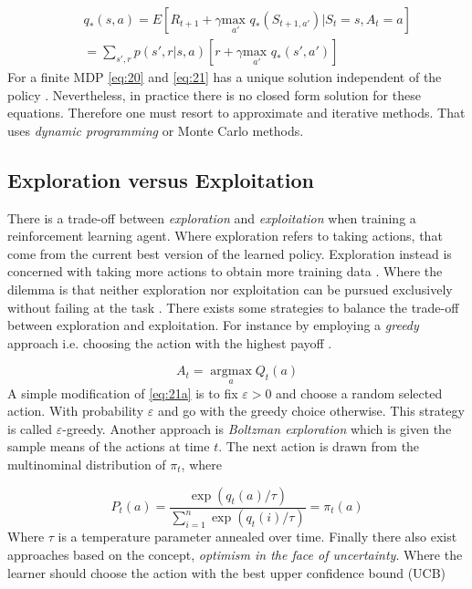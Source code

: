 \documentclass{kththesis}
\theoremstyle{definition}
\begin{document}
\begin{equation}
\label{eq:21}
\begin{aligned}
& & q_{*}(s,a) = 
E[R_{t+1} + \gamma \underset{a'}{\text{max }}q_{*}(S_{t+1, a'}) | S_t =s, A_t = a] \\
& & =  \sum_{s', r}^{}{p(s', r | s,a)}[r + \gamma \underset{a'}{\text{max }}q_{*}(s',a')]
\end{aligned}
\end{equation}
For a finite MDP \autoref{eq:20} and \autoref{eq:21} has a unique solution independent of the policy \parencite{sutton1998reinforcement}. Nevertheless, in practice there is no closed form solution for these equations. Therefore one must resort to approximate and iterative methods. That uses \textit{dynamic programming} or Monte Carlo methods.

\subsection{Exploration versus Exploitation}
There is a trade-off between \textit{exploration} and \textit{exploitation} when training a reinforcement learning agent. Where exploration refers to taking actions, that come from the current best version of the learned policy. Exploration instead is concerned with taking more actions to obtain more training data \parencite{goodfellow2016deep}. Where the dilemma is that neither exploration nor exploitation can be pursued exclusively without failing at the task \parencite{sutton1998reinforcement}. There exists some strategies to balance the trade-off between exploration and exploitation. For instance by employing a \textit{greedy} approach i.e. choosing the action with the highest payoff \parencite{sutton1998reinforcement, szepesvari2009algorithms}.

\begin{equation}
    \label{eq:21a}
    A_t = \underset{a}{\operatorname{argmax}}Q_t(a)
\end{equation}
A simple modification of \autoref{eq:21a} is to fix $\varepsilon > 0$ and choose a random selected action. With probability $\varepsilon$ and go with the greedy choice otherwise. This strategy is called $\varepsilon$-greedy. Another approach is \textit{Boltzman exploration} \parencite{sutton1998reinforcement,szepesvari2009algorithms} which is given the sample means of the actions at time $t$. The next action is drawn from the multinominal distribution of $\pi_t$, where 

\begin{equation}
    \label{eq:21b}
    P_t(a) = \frac{\exp{(q_{t}(a)/\tau)}}{ \sum_{i=1}^{n}{\exp{(q_{t}(i)/ \tau)}}} = \pi_t(a)
\end{equation}
Where $ \tau$ is a temperature parameter annealed over time.
Finally there also exist approaches based on the concept, \textit{optimism in the face of uncertainty}.  Where the learner should choose the action with the best upper confidence bound (UCB) \parencite{sutton1998reinforcement, szepesvari2009algorithms}
\end{document}
